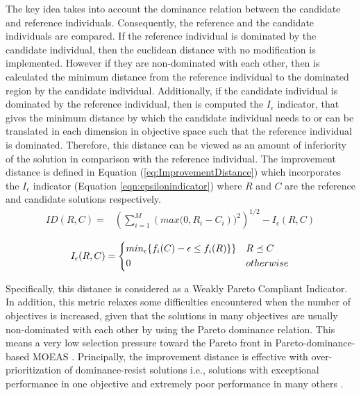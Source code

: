 The key idea takes into account the dominance relation between the candidate and reference individuals. %
%
%
Consequently, the reference and the candidate individuals are compared.
%
If the reference individual is dominated by the candidate individual, then the euclidean distance with no modification is implemented.
%
However if they are non-dominated with each other, then is calculated the minimum distance from the reference individual to the dominated region by the candidate individual. %
%
Additionally, if the candidate individual is dominated by the reference individual, then is computed the $I_\epsilon$ indicator, that gives the minimum distance by which the candidate individual needs to or can be translated in each dimension in objective space such that the reference individual is dominated.
%
Therefore, this distance can be viewed as an amount of inferiority of the solution in comparison with the reference individual.	
%
The improvement distance is defined in Equation (\ref{eq:ImprovementDistance}) which incorporates the $I_\epsilon$ indicator (Equation \ref{eqn:epsilonindicator})  where $R$ and $C$ are the reference and candidate solutions respectively. 
\begin{equation} \label{eq:ImprovementDistance}
\begin{split}
 ID(R, C) = &  \left (\sum_{i=1}^M \left (max(0, R_i - C_i \right ))^2  \right)^{1/2} - I_\epsilon(R,C) \\
\end{split}
\end{equation}
\begin{equation}\label{eqn:epsilonindicator}
\begin{split}
I_\epsilon(R,C) = \begin{dcases}
   min_{\epsilon} \{ f_i(C) - \epsilon \leq f_i (R) \} \} & R \preceq C \\
    0 & otherwise
	\end{dcases}
\end{split}
\end{equation}

Specifically, this distance is considered as a Weakly Pareto Compliant Indicator.
%
In addition, this metric relaxes some difficulties encountered when the number of objectives is increased, given that the solutions in many objectives are usually non-dominated with each other by using the Pareto dominance relation.
%
This means a very low selection pressure toward the Pareto front in Pareto-dominance-based MOEAS \cite{Joel:Optimization_Of_Scalarizing_Functions_Through_Evolutionary_MOEAS}.
%
Principally, the improvement distance is effective with over-prioritization  of dominance-resist solutions i.e., solutions with exceptional performance in one objective and extremely poor performance in many others \cite{Joel:Failure_MOEAs}.
%

